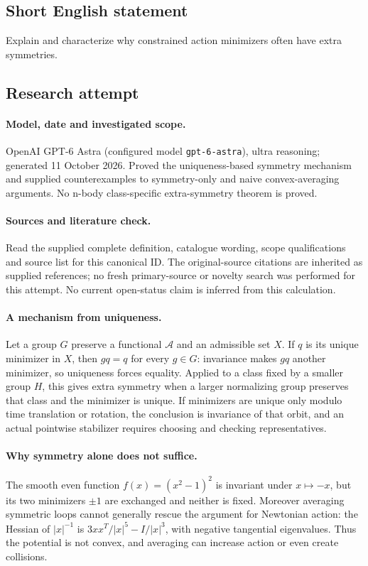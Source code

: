 \documentclass[11pt]{article}
\begin{document}
\subsection{Short English statement}
Explain and characterize why constrained action minimizers often have extra symmetries.
\subsection{Research attempt}
\paragraph{Model, date and investigated scope.}
OpenAI GPT-6 Astra (configured model \texttt{gpt-6-astra}), ultra reasoning; generated 11 October 2026. Proved the uniqueness-based symmetry mechanism and supplied counterexamples to symmetry-only and naive convex-averaging arguments. No n-body class-specific extra-symmetry theorem is proved.

\paragraph{Sources and literature check.}
Read the supplied complete definition, catalogue wording, scope qualifications and source list for this canonical ID. The original-source citations are inherited as supplied references; no fresh primary-source or novelty search was performed for this attempt. No current open-status claim is inferred from this calculation.

\paragraph{A mechanism from uniqueness.}Let a group \(G\) preserve a functional \(\mathcal A\) and an admissible set \(X\). If \(q\) is its unique minimizer in \(X\), then \(gq=q\) for every \(g\in G\): invariance makes \(gq\) another minimizer, so uniqueness forces equality. Applied to a class fixed by a smaller group \(H\), this gives extra symmetry when a larger normalizing group preserves that class and the minimizer is unique. If minimizers are unique only modulo time translation or rotation, the conclusion is invariance of that orbit, and an actual pointwise stabilizer requires choosing and checking representatives.
\paragraph{Why symmetry alone does not suffice.}The smooth even function \(f(x)=(x^2-1)^2\) is invariant under \(x\mapsto-x\), but its two minimizers \(\pm1\) are exchanged and neither is fixed. Moreover averaging symmetric loops cannot generally rescue the argument for Newtonian action: the Hessian of \(|x|^{-1}\) is \(3xx^T/|x|^5-I/|x|^3\), with negative tangential eigenvalues. Thus the potential is not convex, and averaging can increase action or even create collisions.
\end{document}
